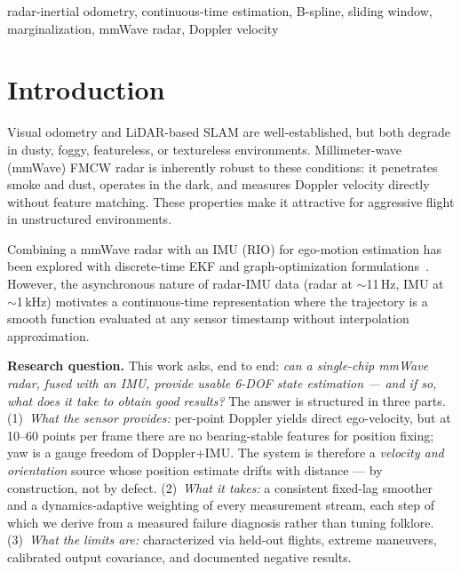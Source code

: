 \documentclass[journal]{IEEEtran}
\begin{document}
\begin{IEEEkeywords}
radar-inertial odometry, continuous-time estimation, B-spline,
sliding window, marginalization, mmWave radar, Doppler velocity
\end{IEEEkeywords}

\section{Introduction}
\label{sec:intro}

Visual odometry and LiDAR-based SLAM are well-established, but both
degrade in dusty, foggy, featureless, or textureless environments.
Millimeter-wave (mmWave) FMCW radar is inherently robust to these
conditions: it penetrates smoke and dust, operates in the dark, and
measures Doppler velocity directly without feature matching.  These
properties make it attractive for aggressive flight in unstructured
environments.

Combining a mmWave radar with an IMU (RIO) for ego-motion estimation
has been explored with discrete-time EKF and graph-optimization
formulations~\cite{doer2020ekf,kramer2020rve}.  However, the
asynchronous nature of radar-IMU data (radar at $\sim$11\,Hz, IMU at
$\sim$1\,kHz) motivates a continuous-time representation where the
trajectory is a smooth function evaluated at any sensor timestamp
without interpolation approximation.

\textbf{Research question.}
This work asks, end to end: \emph{can a single-chip mmWave radar,
fused with an IMU, provide usable 6-DOF state estimation --- and if
so, what does it take to obtain good results?}  The answer is
structured in three parts.  (1)~\emph{What the sensor provides:}
per-point Doppler yields direct ego-velocity, but at 10--60 points
per frame there are no bearing-stable features for position fixing;
yaw is a gauge freedom of Doppler+IMU.  The system is therefore a
\emph{velocity and orientation} source whose position estimate drifts
with distance --- by construction, not by defect.  (2)~\emph{What it
takes:} a consistent fixed-lag smoother and a dynamics-adaptive
weighting of every measurement stream, each step of which we derive
from a measured failure diagnosis rather than tuning folklore.
(3)~\emph{What the limits are:} characterized via held-out flights,
extreme maneuvers, calibrated output covariance, and documented
negative results.
\end{document}

